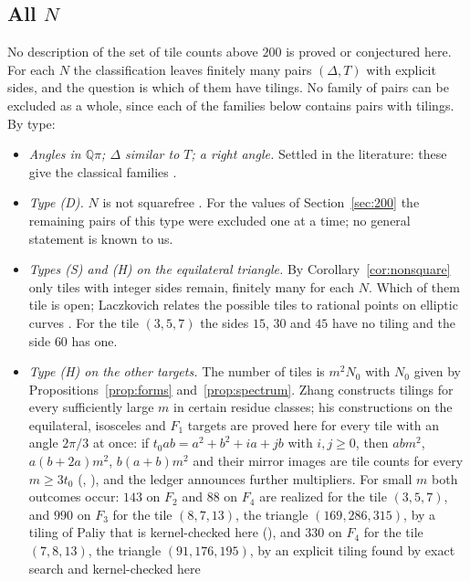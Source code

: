 \documentclass[11pt,reqno]{amsart}
\theoremstyle{plain}
\theoremstyle{definition}
\newcommand{\Q}{\mathbb{Q}}
\begin{document}
\subsection{All $N$}
No description of the set of tile counts above $200$ is proved or conjectured here. For each $N$ the
classification leaves finitely many pairs $(\Delta,T)$ with explicit sides, and the question is which of
them have tilings. No family of pairs can be excluded as a whole, since each of the families below contains
pairs with tilings. By type:
\begin{itemize}
\item \emph{Angles in $\Q\pi$; $\Delta$ similar to $T$; a right angle.} Settled in the literature: these
give the classical families \cite{BeesonSeven,BeesonI,SWW}.
\item \emph{Type \textup{(D)}.} $N$ is not squarefree \cite[Thm.~11.7]{BeesonIso}. For the values of
Section~\ref{sec:200} the remaining pairs of this type were excluded one at a time; no general statement is
known to us.
\item \emph{Types \textup{(S)} and \textup{(H)} on the equilateral triangle.} By
Corollary~\ref{cor:nonsquare} only tiles with integer sides remain, finitely many for each $N$. Which of
them tile is open; Laczkovich relates the possible tiles to rational points on elliptic curves
\cite{LaczkovichEll}. For the tile $(3,5,7)$ the sides $15$, $30$ and $45$ have no tiling and the side $60$ has
one.
\item \emph{Type \textup{(H)} on the other targets.} The number of tiles is $m^2N_0$ with $N_0$ given by
Propositions~\ref{prop:forms} and~\ref{prop:spectrum}. Zhang \cite{Zhang} constructs tilings for every
sufficiently large $m$ in certain residue classes; his constructions on the equilateral, isosceles and $F_1$ targets are proved here for every tile with an angle $2\pi/3$ at once: if $t_0ab=a^2+b^2+ia+jb$ with $i,j\ge0$, then $abm^2$, $a(b+2a)m^2$, $b(a+b)m^2$ and their mirror images are tile counts for every $m\ge3t_0$ (, ), and the ledger \cite{PaliyLedger} announces further multipliers. For small
$m$ both outcomes occur: $143$ on $F_2$ and $88$ on $F_4$ are realized for the tile $(3,5,7)$, and $990$
on $F_3$ for the tile $(8,7,13)$, the triangle $(169,286,315)$, by a tiling of Paliy \cite{PaliyTilings}
that is kernel-checked here (), and $330$ on $F_4$ for the tile $(7,8,13)$, the
triangle $(91,176,195)$, by an explicit tiling found by exact search and kernel-checked here

\end{itemize}
\end{document}
